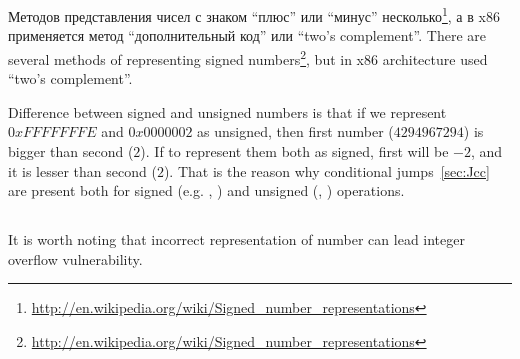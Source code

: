 ﻿\section{\SignedNumbersSectionName}
\label{sec:signednumbers}

\newcommand{\URLS}{\url{http://en.wikipedia.org/wiki/Signed_number_representations}}

\IFRU
{Методов представления чисел с знаком ``плюс'' или ``минус'' несколько\footnote{\URLS}, 
а в x86 применяется метод ``дополнительный код'' или ``two's complement''.}
{There are several methods of representing signed numbers\footnote{\URLS}, 
but in x86 architecture used ``two's complement''.}

{Difference between signed and unsigned numbers is that if we represent $0xFFFFFFFE$ and $0x0000002$ 
as unsigned, then first number ($4294967294$) is bigger than second ($2$). 
If to represent them both as signed, first will be $-2$, and it is lesser than second ($2$). 
That is the reason why conditional jumps~\ref{sec:Jcc} are present both for signed (e.g. \JG, \JL) 
and unsigned (\JA, \JB) operations.}

\subsection{}

{It is worth noting that incorrect representation of number can lead integer overflow vulnerability.}

